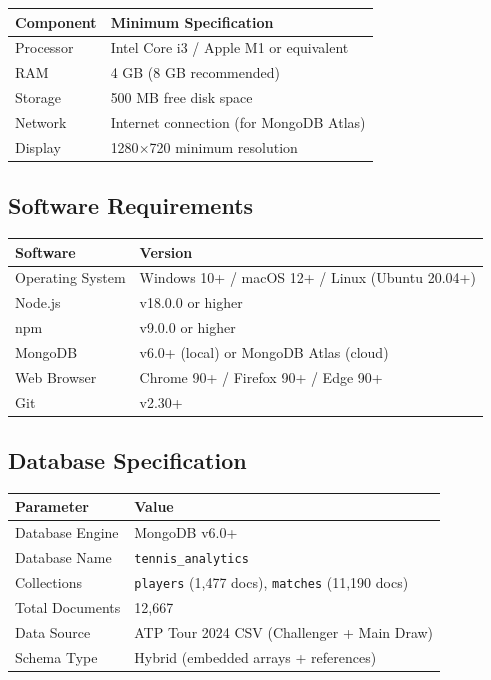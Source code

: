 \documentclass[12pt,a4paper]{article}
\begin{document}
\begin{tabular}{|l|l|}
    \hline
    \textbf{Component}   & \textbf{Minimum Specification} \\
    \hline
    Processor            & Intel Core i3 / Apple M1 or equivalent \\
    \hline
    RAM                  & 4 GB (8 GB recommended) \\
    \hline
    Storage              & 500 MB free disk space \\
    \hline
    Network              & Internet connection (for MongoDB Atlas) \\
    \hline
    Display              & 1280$\times$720 minimum resolution \\
    \hline
\end{tabular}

\subsection{Software Requirements}

\begin{tabular}{|l|l|}
    \hline
    \textbf{Software}      & \textbf{Version} \\
    \hline
    Operating System        & Windows 10+ / macOS 12+ / Linux (Ubuntu 20.04+) \\
    \hline
    Node.js                 & v18.0.0 or higher \\
    \hline
    npm                     & v9.0.0 or higher \\
    \hline
    MongoDB                 & v6.0+ (local) or MongoDB Atlas (cloud) \\
    \hline
    Web Browser             & Chrome 90+ / Firefox 90+ / Edge 90+ \\
    \hline
    Git                     & v2.30+ \\
    \hline
\end{tabular}

\subsection{Database Specification}

\begin{tabular}{|l|l|}
    \hline
    \textbf{Parameter}           & \textbf{Value} \\
    \hline
    Database Engine              & MongoDB v6.0+ \\
    \hline
    Database Name                & \texttt{tennis\_analytics} \\
    \hline
    Collections                  & \texttt{players} (1,477 docs), \texttt{matches} (11,190 docs) \\
    \hline
    Total Documents              & 12,667 \\
    \hline
    Data Source                  & ATP Tour 2024 CSV (Challenger + Main Draw) \\
    \hline
    Schema Type                  & Hybrid (embedded arrays + references) \\
    \hline
\end{tabular}
\end{document}
